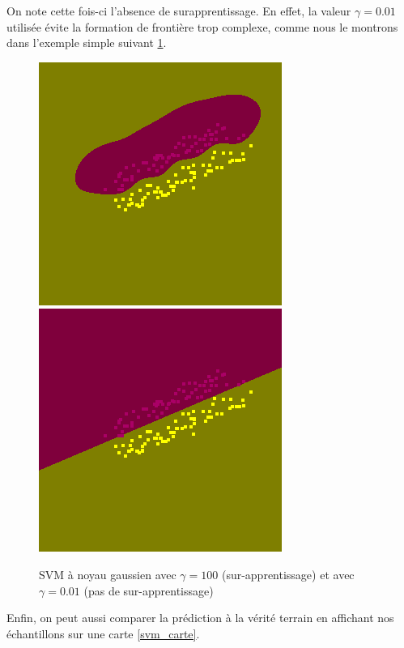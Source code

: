 \documentclass{book}
\begin{document}
On note cette fois-ci l'absence de surapprentissage. En effet, la valeur $\gamma=0.01$ utilisée évite la formation de frontière trop complexe, comme nous le montrons dans l'exemple simple
suivant \ref{svm_exemple2}.\\
\begin{figure}[H]
 \begin{center}
\includegraphics[scale=0.5]{images/svm/svm_g_100.png}
\includegraphics[scale=0.5]{images/svm/svm_g_001.png}
 \caption{SVM à noyau gaussien avec $\gamma=100$ (sur-apprentissage) et avec $\gamma=0.01$ (pas de sur-apprentissage)}
 \label{svm_exemple2}
 \end{center}
\end{figure}

Enfin, on peut aussi comparer la prédiction à la vérité terrain en affichant nos échantillons sur une carte \ref{svm_carte}.
\end{document}
